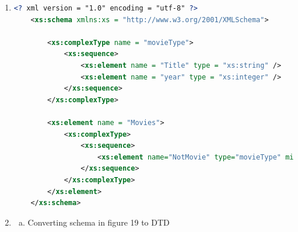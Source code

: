 \documentclass[12pt]{article}
\begin{document}
\begin{enumerate}[1.]
\begin{itemize}
\begin{itemize}
            \bigskip

            $<$xs:keyref name = \textit{foreign-key name} refer = \textit{key name} $>$

            \quad$<$xs:selector xpath = \textit{path description} $>$

            \quad$<$xs:field xpath = \textit{path description} $>$

            $<$/xs:keyref $>$
        \end{itemize}
    \end{itemize}

    \bigskip

    \underline{\textbf{References:}}

    \bigskip

    \begin{enumerate}[1.]
        \item w3School : Complex Type, \href{https://www.w3schools.com/xml/el_complextype.asp}{link}
    \end{enumerate}

    \item

    \begin{lstlisting}[language=XML]
    <? xml version = "1.0" encoding = "utf-8" ?>
    <xs:schema xmlns:xs = "http://www.w3.org/2001/XMLSchema">

        <xs:complexType name = "movieType">
            <xs:sequence>
                <xs:element name = "Title" type = "xs:string" />
                <xs:element name = "year" type = "xs:integer" />
            </xs:sequence>
        </xs:complexType>

        <xs:element name = "Movies">
            <xs:complexType>
                <xs:sequence>
                    <xs:element name="NotMovie" type="movieType" minOccurs="0" maxOccurs = "unbounded" /> // <- Corrected
                </xs:sequence>
            </xs:complexType>
        </xs:element>
    </xs:schema>
    \end{lstlisting}

    \item

    \begin{enumerate}[a)]
        \item Converting schema in figure 19 to DTD

        \bigskip


\end{enumerate}
\end{enumerate}
\end{document}
